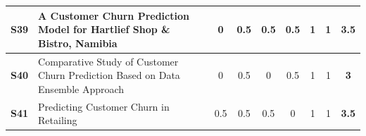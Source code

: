 \begin{table}[H]
{\begin{tabular}{|l|l|c|c|c|c|c|c|c|}
\hline
\rowcolor{lightgray} \textbf{S39}                                    & A Customer Churn Prediction Model for Hartlief Shop \& Bistro, Namibia \cite{S39-ID861-Ashipala}                                                                                                                                                                & 0          & 0.5        & 0.5        & 0.5        & 1          & 1          & \textbf{3.5}     \\ 
\hline
\textbf{S40}                                                                      & Comparative Study of Customer Churn Prediction Based on Data Ensemble Approach \cite{S40-ID1045-Kumar}                                                                                                            & 0          & 0.5        & 0          & 0.5        & 1          & 1          & \textbf{3}     \\ 
\hline
\rowcolor{lightgray} \textbf{S41}                                    & Predicting Customer Churn in Retailing \cite{S41-ID1064-Sweidan}                                                                                                                                                                                              & 0.5        & 0.5        & 0.5        & 0          & 1          & 1          & \textbf{3.5}     \\
\hline
\end{tabular}
}
\end{table}
